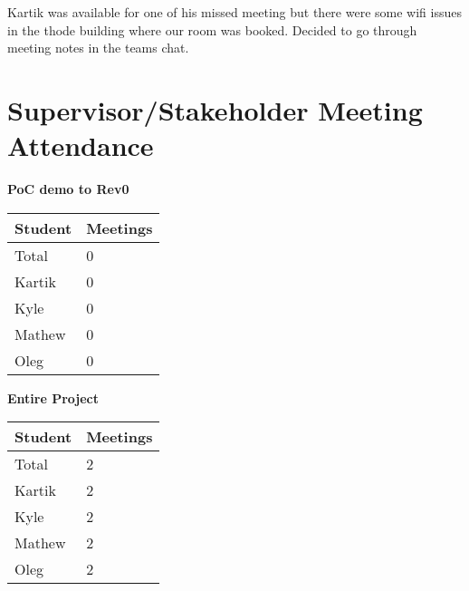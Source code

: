 \documentclass{article}
\begin{document}
Kartik was available for one of his missed meeting but there were some wifi issues in the thode building where our room was booked. Decided to go through meeting notes in the teams chat. \\

\section{Supervisor/Stakeholder Meeting Attendance}



\begin{table}[H]
    \centering
    \textbf{PoC demo to Rev0}\\
    \begin{tabular}{ll}
    \toprule
    \textbf{Student} & \textbf{Meetings}\\
    \midrule
    Total  & 0\\
    Kartik & 0\\
    Kyle   & 0\\
    Mathew & 0\\
    Oleg   & 0\\
\bottomrule
\end{tabular}
\end{table}


\begin{table}[H]
\centering
\textbf{Entire Project}\\
\begin{tabular}{ll}
\toprule
\textbf{Student} & \textbf{Meetings}\\
\midrule
Total  & 2\\
Kartik & 2\\
Kyle   & 2\\
Mathew & 2\\
Oleg   & 2\\
\bottomrule
\end{tabular}
\end{table}

\end{document}
